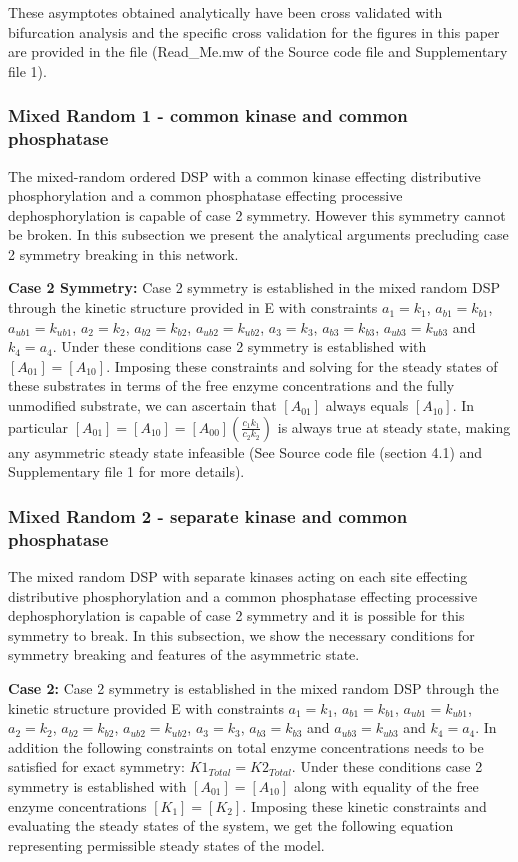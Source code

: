 \documentclass[9pt,lineno]{elife}
\begin{document}
\begin{appendixbox}
These asymptotes obtained analytically have been cross validated with bifurcation analysis and the specific cross validation for the figures in this paper are provided in the file (\textrm{Read\_Me.mw} of the Source code file and Supplementary file 1).

\subsubsection*{Mixed Random 1 - common kinase and common phosphatase}

The mixed-random ordered DSP with a common kinase effecting  distributive phosphorylation and a common phosphatase effecting processive dephosphorylation is capable of case 2 symmetry. However  this symmetry cannot be broken. In this subsection we present the analytical arguments precluding case 2 symmetry breaking in this network.

\textbf{Case 2 Symmetry:} Case 2 symmetry is established in the mixed random DSP through the kinetic structure provided in E with constraints $a_1 = k_1$, $a_{b1} = k_{b1}$, $a_{ub1} = k_{ub1}$, $a_2 = k_2$, $a_{b2} = k_{b2}$, $a_{ub2} = k_{ub2}$, $a_3 = k_3$, $a_{b3} = k_{b3}$, $a_{ub3} = k_{ub3}$ and $k_4 = a_4$. Under these conditions case 2 symmetry is established with $[A_{01}]= [A_{10}]$. Imposing these constraints and solving for the steady states of these substrates in terms of the free enzyme concentrations and the fully unmodified substrate, we can ascertain that $[A_{01}]$ always equals $[A_{10}]$. In  particular $[A_{01}] = [A_{10}] = [A_{00}]\left(\frac{c_1k_1}{c_2k_2}\right)$ is always true at steady state, making any asymmetric  steady state infeasible (See Source code file (section 4.1) and Supplementary file 1 for more details).

\subsubsection*{Mixed Random 2 - separate kinase and common phosphatase}

The mixed random DSP with separate kinases acting on each site effecting  distributive phosphorylation and a common phosphatase effecting  processive dephosphorylation is capable of case 2 symmetry and it is possible for this symmetry to break. In this subsection, we show the necessary conditions for symmetry breaking and features of the asymmetric state. 

\textbf{Case 2:} Case 2 symmetry is established in the mixed random DSP through the kinetic structure provided E with constraints $a_1 = k_1$, $a_{b1} = k_{b1}$, $a_{ub1} = k_{ub1}$, $a_2 = k_2$, $a_{b2} = k_{b2}$, $a_{ub2} = k_{ub2}$, $a_3 = k_3$, $a_{b3} = k_{b3}$ and $a_{ub3} = k_{ub3}$ and $k_4 = a_4$. In addition the following constraints on total enzyme concentrations  needs to be satisfied for exact symmetry: $K1_{Total} = K2_{Total}$. Under these conditions case 2 symmetry is established with $[A_{01}]= [A_{10}]$ along with equality  of the free enzyme concentrations  $[K_1]= [K_2]$. Imposing these kinetic constraints and evaluating the steady states of the system, we get the following equation representing permissible steady states of the model. 


\end{appendixbox}
\end{document}

